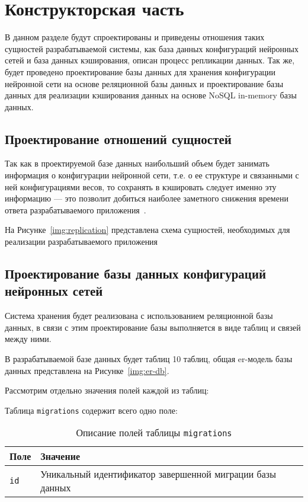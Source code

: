 \chapter{Конструкторская часть}

В данном разделе будут спроектированы и приведены отношения таких сущностей разрабатываемой системы, как база данных конфигураций нейронных сетей и база данных кэширования, описан процесс репликации данных. Так же, будет проведено проектирование базы данных для хранения конфигурации нейронной сети на основе реляционной базы данных и проектирование базы данных для реализации кэширования данных на основе NoSQL in-memory базы данных.

\section{Проектирование отношений сущностей}

Так как в проектируемой базе данных наибольший объем будет занимать информация о конфигурации нейронной сети, т.е. о ее структуре и связанными с ней конфигурациями весов, то сохранять в кэшировать следует именно эту информацию --- это позволит добиться наиболее заметного снижения времени ответа разрабатываемого приложения~\cite{cache-what-is-it}. 

На Рисунке~\ref{img:replication} представлена схема сущностей, необходимых для реализации разрабатываемого приложения


\section{Проектирование базы данных конфигураций нейронных сетей}

Система хранения будет реализована с использованием реляционной базы данных, в связи с этим проектирование базы выполняется в виде таблиц и связей между ними.

В разрабатываемой базе данных будет таблиц 10 таблиц, общая er-модель базы данных представлена на Рисунке~\ref{img:er-db}.


Рассмотрим отдельно значения полей каждой из таблиц:

Таблица \texttt{migrations} содержит всего одно поле:
\begin{table}[!ht]
    \caption{Описание полей таблицы \texttt{migrations}}
    \label{tbl:migrations}
    \begin{center}
        \begin{tabular}{|p{}|p{}|}
            \hline
            \textbf{Поле} & \textbf{Значение} \\\hline
            \texttt{id} & Уникальный идентификатор завершенной миграции базы данных \\\hline
        \end{tabular}
    \end{center}
\end{table}

